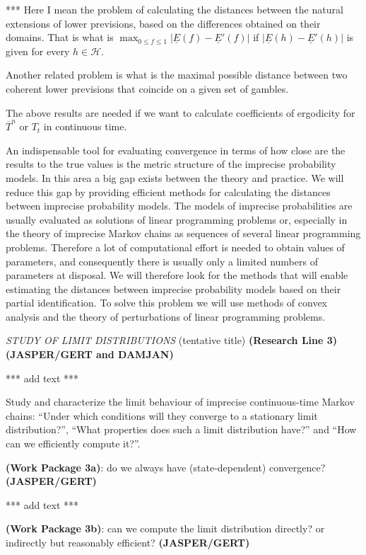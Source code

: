 \documentclass[11pt,dvipsnames,usenames,a4paper]{article}
\begin{document}
*** Here I mean the problem of calculating the distances between the natural extensions of lower previsions, based on the differences obtained on their domains. That is what is $\max_{0\le f \le 1} |\underline E(f)-\underline E'(f)|$ if $ |\underline E(h)-\underline E'(h)|$ is given for every $h \in \mathcal H$. 
 
 Another related problem is what is the maximal possible distance between two coherent lower previsions that coincide on a given set of gambles. 
 
 The above results are needed if we want to calculate coefficients of ergodicity for $\overline T^n$ or $T_t$ in continuous time. 

 An indispensable tool for evaluating convergence in terms of how close are the results to the true values is the metric structure of the imprecise probability models. In this area a big gap exists between the theory and practice. We will reduce this gap by providing efficient methods for calculating the distances between imprecise probability models. The models of imprecise probabilities are usually evaluated as solutions of linear programming problems or, especially in the theory of imprecise Markov chains as sequences of several linear programming problems. Therefore a lot of computational effort is needed to obtain values of parameters, and consequently there is usually only a limited numbers of parameters at disposal. We will therefore look for the methods that will enable estimating the distances between imprecise probability models based on their partial identification. To solve this problem we will use methods of convex analysis and the theory of perturbations of linear programming problems. 


\emph{STUDY OF LIMIT DISTRIBUTIONS} (tentative title) {\bf (Research Line 3)} 
{\bf\color{blue} (JASPER/GERT and DAMJAN)}

*** add text ***

Study and characterize the limit behaviour of imprecise continuous-time Markov chains: ``Under which conditions will they converge to a stationary limit distribution?'', ``What properties does such a limit distribution have?'' and ``How can we efficiently compute it?''. 

{\bf (Work Package 3a)}: do we always have (state-dependent) convergence? {\bf\color{blue} (JASPER/GERT)}

*** add text ***

{\bf (Work Package 3b)}: can we compute the limit distribution directly? or indirectly but reasonably efficient? {\bf\color{blue} (JASPER/GERT)}
\end{document}
